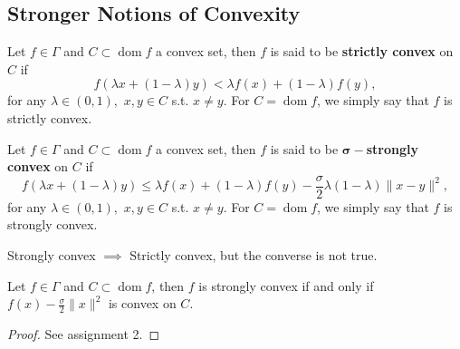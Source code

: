 \documentclass{tufte-handout}
\DeclareMathOperator{\dom}{dom}
\begin{document}
{\begin{remark}[Notation]
\end{remark}
\subsection{Stronger Notions of Convexity}
\begin{definition}
  Let $f \in \Gamma$ and $C \subset \dom f$ a convex set, then $f$ is said to be \textbf{strictly convex} on $C$ if $$f(\lambda x + (1-\lambda)y)< \lambda f(x) + (1- \lambda )f(y),$$ 
  for any $\lambda \in (0,1),$ $x,y \in C $ s.t. $x \neq y$. For $C = \dom f$, we simply say that $f$ is strictly convex. 

\end{definition}
\begin{definition}
  Let $f \in \Gamma$ and $C \subset \dom f$ a convex set, then $f$ is said to be $\pmb{\sigma}-$\textbf{strongly convex} on $C$ if 
  $$f(\lambda x + (1-\lambda)y)\leq \lambda f(x) + (1- \lambda )f(y)- \frac{\sigma}{2}\lambda (1-\lambda)\|x-y\|^2 ,$$ 
  for any $\lambda \in (0,1),$ $x,y \in C $ s.t. $x \neq y$. For $C = \dom f$, we simply say that $f$ is strongly convex. 
\end{definition}
\begin{remark} 
  Strongly convex $\implies$ Strictly convex, but the converse is not true. 
\end{remark}
\begin{proposition} \label{label}
  Let $f \in \Gamma$ and $C\subset \dom f$, then $f$ is strongly convex if and only if $f(x)- \frac{\sigma}{2} \| x \| ^2  $ is convex on $C$. 
  \begin{proof} 
    See assignment 2.
  \end{proof}
\end{proposition}
}
\end{document}
